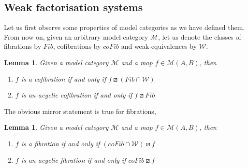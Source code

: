 \documentclass{amsart}
\newtheorem{lemma}[theorem]{Lemma}
\theoremstyle{definition}
\begin{document}
\subsection{Weak factorisation systems}
Let us first observe some
properties of model categories as we have defined them.
\\
\indent
From now on, given an arbitrary model category $\mathcal{M}$, let us denote
the classes of fibrations by $Fib$, cofibrations by $coFib$ and weak-equivalences
by $\mathcal{W}$. 
\begin{lemma}\label{modelchar1}
      Given a model category $\mathcal{M}$ and a map $f\in \mathcal{M}(A,B)$, then
    \begin{enumerate}
    \item 
      $f$ is a cofibration if and only if $f\boxslash (Fib\cap \mathcal{W})$
    \item 
      $f$ is an acyclic cofibration if and only if
      $f\boxslash Fib$
    \end{enumerate}
\end{lemma}
The obvious mirror statement is true for fibrations,

\begin{lemma}\label{modelchar2}
      Given a model category $\mathcal{M}$ and a map $f\in \mathcal{M}(A,B)$, then
    \begin{enumerate}
    \item 
      $f$ is a fibration if and only if $(coFib\cap \mathcal{W})\boxslash f$
    \item 
      $f$ is an acyclic fibration if and only if
      $coFib \boxslash f$
    \end{enumerate}
  \end{lemma}
\end{document}
